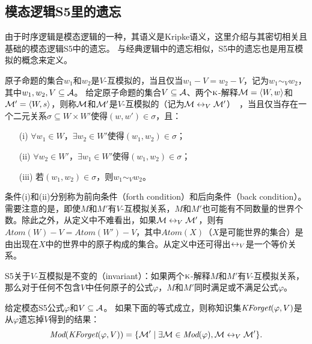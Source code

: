 \subsection{模态逻辑S5里的遗忘}\label{chapter:sub:s5forgetting}

由于时序逻辑是模态逻辑的一种，其语义是Kripke语义，这里介绍与其密切相关且基础的模态逻辑S5中的遗忘。
与经典逻辑中的遗忘相似，S5中的遗忘也是用互模拟的概念来定义。

原子命题的集合$w_1$和$w_2$是$V$-互模拟的，当且仅当$w_1 -V = w_2 -V$，记为$w_1 \sim_V w_2$，其中$w_1, w_2, V \subseteq {\cal A}$。
给定原子命题的集合$V\subseteq {\cal A}$、两个$\textsc{k}$-解释${\cal M}={\langle{W,w}\rangle}$和${\cal M}'={\langle{W,s}\rangle}$，则称${\cal M}$和${\cal M}'$是$V$-互模拟的（记为${\cal M} \leftrightarrow_{V} {\cal M}'$）~\cite{Zhang2008Properties}，当且仅当存在一个二元关系$\sigma \subseteq W \times W'$使得$(w,w') \in \sigma$，且：
\begin{itemize}
	\item[(i)] $\forall w_1 \in W$，$\exists w_2\in W'$使得$(w_1, w_2) \in \sigma$；
	\item[(ii)] $\forall w_2 \in W'$，$\exists w_1\in W'$使得$(w_1, w_2) \in \sigma$；
	\item[(iii)] 若$(w_1, w_2) \in \sigma$，则$w_1\sim_V w_2$。
\end{itemize}

条件(i)和(ii)分别称为前向条件（forth condition）和后向条件（back condition）。需要注意的是，即使$M$和$M'$有$V$-互模拟关系，$M$和$M'$也可能有不同数量的世界个数。除此之外，从定义中不难看出，如果${\cal M} \leftrightarrow_{V} {\cal M}'$，则有$Atom(W)-V=Atom(W' )-V$，其中$Atom(X)$（$X$是可能世界的集合）是由出现在$X$中的世界中的原子构成的集合。从定义中还可得出$\leftrightarrow_V$是一个等价关系。

S5关于$V$-互模拟是不变的（invariant）：如果两个$\textsc{k}$-解释$M$和$M'$有$V$-互模拟关系，那么对于任何不包含$V$中任何原子的公式$\varphi$，$M$和$M'$同时满足或不满足公式$\varphi$。

\begin{definition}\label{def:s5forgetting}
	给定模态S5公式$\varphi$和$V\subseteq {\cal A}$。
	如果下面的等式成立，则称知识集$\textit{KForget}(\varphi,V)$是从$\varphi$遗忘掉$V$得到的结果：
	$$\textit{Mod}(\textit{KForget}(\varphi, V)) = \{{\cal M}' \mid \exists {\cal M} \in \textit{Mod}(\varphi), {\cal M} \leftrightarrow_V {\cal M}'\}.$$
\end{definition}

